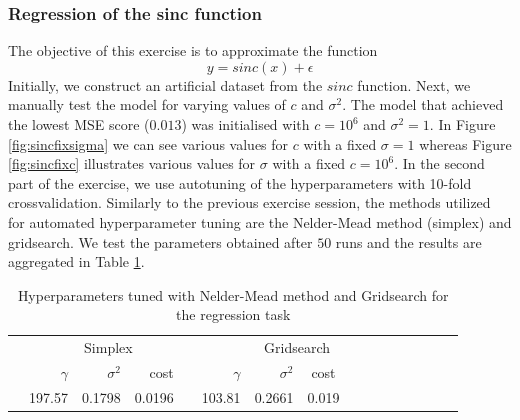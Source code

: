 \documentclass[a4paper, 11pt, one column]{article}
\begin{document}
\subsubsection{Regression of the sinc function}
The objective of this exercise is to approximate the function
\begin{equation}
    y = sinc (x) + \epsilon
\end{equation}
 Initially, we construct an artificial dataset from the $sinc$ function. Next, we manually test the model for varying values of $c$ and $\sigma^2$. The model that achieved the lowest MSE score ($0.013$) was initialised with $c=10^6$ and $\sigma^2=1$. In Figure \ref{fig:sincfixsigma} we can see various values for $c$ with a fixed $\sigma=1$ whereas Figure \ref{fig:sincfixc} illustrates various values for $\sigma$ with a fixed $c=10^6$.
In the second part of the exercise, we use autotuning of the hyperparameters with 10-fold crossvalidation. Similarly to the previous exercise session, the methods utilized for automated hyperparameter tuning are the Nelder-Mead method (simplex) and gridsearch. We test the parameters obtained after $50$ runs and the results are aggregated in Table \ref{fig:tbl2}. %

\begin{table}[H]\centering
\begin{tabular}{@{}rrrrrrrccrrrcrrr@{}}\toprule
& \multicolumn{4}{c}{Simplex} & \phantom{abc}& \multicolumn{2}{c}{Gridsearch} &
\phantom{abc} \\
\cmidrule{1-5} \cmidrule{6-9} \cmidrule{10-12}
& $\gamma$ & $\sigma^2$ &     cost &&  $\gamma$ & $\sigma^2$ &    cost \\ \midrule
 &  197.57 & 0.1798 &  0.0196 && 103.81 & 0.2661 & 0.019 \\
\bottomrule
\end{tabular}
\caption{Hyperparameters tuned with Nelder-Mead method and Gridsearch for the regression task}
       \label{fig:tbl2}
\end{table}
\end{document}
